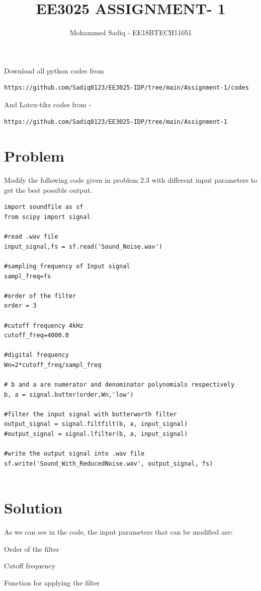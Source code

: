 \documentclass[journal,12pt,twocolumn]{IEEEtran}
\begin{document}
     \def\rightbox#1{\makebox[0in][r]{#1}}
     \def\centbox#1{\makebox[0in]{#1}}
     \def\topbox#1{\raisebox{-\baselineskip}[0in][0in]{#1}}
     \def\midbox#1{\raisebox{-0.5\baselineskip}[0in][0in]{#1}}
\vspace{3cm}
\title{EE3025 ASSIGNMENT- 1}
\author{Mohammed Sadiq - EE18BTECH11051}
\maketitle
\newpage
\bigskip
\renewcommand{\thefigure}{\theenumi}
\renewcommand{\thetable}{\theenumi}
Download all python codes from 
\begin{lstlisting}
https://github.com/Sadiq0123/EE3025-IDP/tree/main/Assignment-1/codes
\end{lstlisting}
And Latex-tikz codes from - 
\begin{lstlisting}
https://github.com/Sadiq0123/EE3025-IDP/tree/main/Assignment-1
\end{lstlisting}
%
\section{\textbf{Problem}}
    
Modify the following code given in problem 2.3 with different input parameters to get the best possible output.
\begin{lstlisting}
import soundfile as sf
from scipy import signal
    
#read .wav file
input_signal,fs = sf.read('Sound_Noise.wav')
    
#sampling frequency of Input signal
sampl_freq=fs
    
#order of the filter
order = 3
    
#cutoff frequency 4kHz
cutoff_freq=4000.0
    
#digital frequency
Wn=2*cutoff_freq/sampl_freq
    
# b and a are numerator and denominator polynomials respectively
b, a = signal.butter(order,Wn,'low')
    
#filter the input signal with butterworth filter
output_signal = signal.filtfilt(b, a, input_signal)
#output_signal = signal.lfilter(b, a, input_signal)
    
#write the output signal into .wav file
sf.write('Sound_With_ReducedNoise.wav', output_signal, fs)
    
\end{lstlisting}

  \section{\textbf{Solution}}
  As we can see in the code, the input parameters that can be modified are:
  \begin{description}[font=$\bullet$\scshape\bfseries]
  \item[]{Order of the filter}
  \item[]{Cutoff frequency}
  \item[]{Function for applying the filter}
  \end{description}
  
\end{document}
